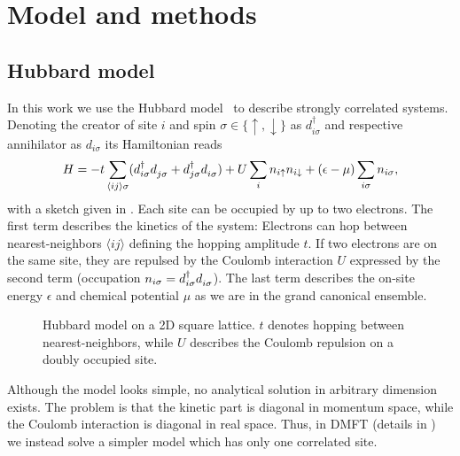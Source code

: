 
\chapter{Model and methods}

\section{Hubbard model}%
\label{sec:hubbard-model}

In this work we use the Hubbard model~\cite{Hubbard1997} to describe strongly correlated systems.
Denoting the creator of site $i$ and spin $\sigma\in\{\uparrow,\downarrow\}$
as $d^\dag_{i\sigma}$ and respective annihilator as $d_{i\sigma}$ its Hamiltonian reads
\begin{equation}
    H
    =
    -t\sum_{\langle i j\rangle\sigma}
    (d^\dag_{i\sigma} d^{\pdag}_{j\sigma} + d^\dag_{j\sigma} d^{\pdag}_{i\sigma})
    +
    U\sum_i n_{i\uparrow} n_{i\downarrow}
    +
    (\epsilon - \mu)\sum_{i\sigma} n_{i\sigma},
    \label{eq:hubbard}
\end{equation}
with a sketch given in .
Each site can be occupied by up to two electrons.
The first term describes the kinetics of the system:
Electrons can hop between nearest-neighbors $\langle i j\rangle$
defining the hopping amplitude $t$.
If two electrons are on the same site, they are repulsed by the Coulomb interaction $U$
expressed by the second term (occupation $n_{i\sigma} = d^\dag_{i\sigma} d^{\pdag}_{i\sigma}$).
The last term describes the on-site energy $\epsilon$ and
chemical potential $\mu$ as we are in the grand canonical ensemble.

\begin{figure}[ht]
    \centering
    
    \caption{
        Hubbard model on a 2D square lattice.
        $t$ denotes hopping between nearest-neighbors,
        while $U$ describes the Coulomb repulsion on a doubly occupied site.
    }%
    \label{fig:hubbard-model}
\end{figure}

Although the model looks simple, no analytical solution in arbitrary dimension exists.
The problem is that the kinetic part is diagonal in momentum space,
while the Coulomb interaction is diagonal in real space.
Thus, in DMFT (details in ) we instead solve a simpler model which has only one correlated site.


